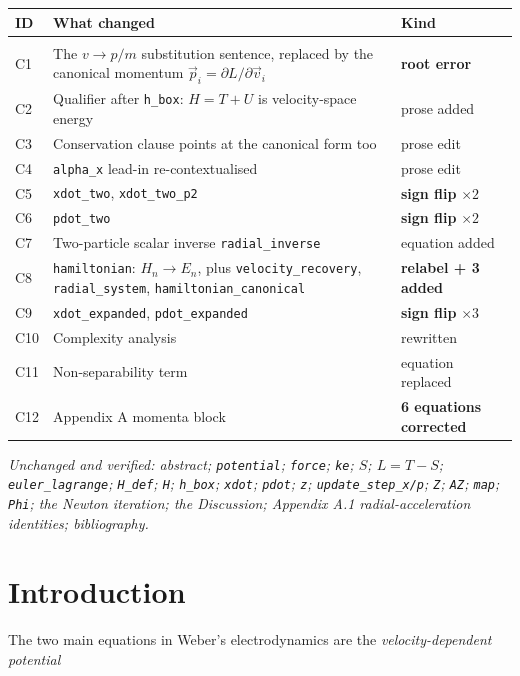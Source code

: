 \documentclass[12pt,a4paper]{article}
\theoremstyle{definition}
\theoremstyle{remark}
\begin{document}
\noindent\small
\begin{tabular}{@{}p{2.2em}p{9.2cm}p{4.1cm}@{}}
\textbf{ID} & \textbf{What changed} & \textbf{Kind} \\[2pt]
\hline\\[-6pt]
C1  & The $v \to p/m$ substitution sentence, replaced by the canonical momentum $\vec p_i = \partial L/\partial \vec v_i$ & \textbf{root error} \\
C2  & Qualifier after \texttt{h\_box}: $H = T+U$ is velocity-space energy & prose added \\
C3  & Conservation clause points at the canonical form too & prose edit \\
C4  & \texttt{alpha\_x} lead-in re-contextualised & prose edit \\
C5  & \texttt{xdot\_two}, \texttt{xdot\_two\_p2} & \textbf{sign flip} $\times 2$ \\
C6  & \texttt{pdot\_two} & \textbf{sign flip} $\times 2$ \\
C7  & Two-particle scalar inverse \texttt{radial\_inverse} & equation added \\
C8  & \texttt{hamiltonian}: $H_n \to E_n$, plus \texttt{velocity\_recovery}, \texttt{radial\_system}, \texttt{hamiltonian\_canonical} & \textbf{relabel + 3 added} \\
C9  & \texttt{xdot\_expanded}, \texttt{pdot\_expanded} & \textbf{sign flip} $\times 3$ \\
C10 & Complexity analysis & rewritten \\
C11 & Non-separability term & equation replaced \\
C12 & Appendix A momenta block & \textbf{6 equations corrected} \\
\end{tabular}

\bigskip
\noindent\small\textit{Unchanged and verified: abstract; \texttt{potential}; \texttt{force};
\texttt{ke}; $S$; $L = T-S$; \texttt{euler\_lagrange}; \texttt{H\_def}; \texttt{H};
\texttt{h\_box}; \texttt{xdot}; \texttt{pdot}; \texttt{z}; \texttt{update\_step\_x/p};
\texttt{Z}; \texttt{AZ}; \texttt{map}; \texttt{Phi}; the Newton iteration; the Discussion;
Appendix A.1 radial-acceleration identities; bibliography.}

\clearpage


\section{Introduction}

The two main equations in Weber's electrodynamics are the \textit{velocity-dependent potential}
\end{document}
